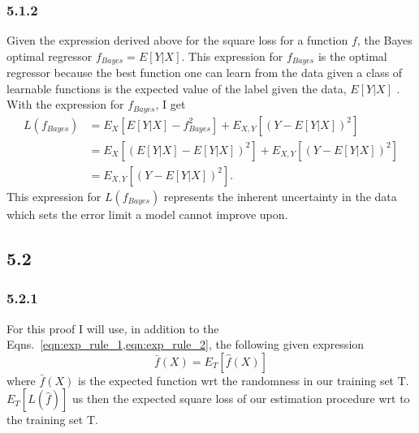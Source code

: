 \documentclass[12pt]{amsart}
\begin{document}
\subsubsection*{5.1.2}
Given the expression derived above for the square loss for a function $f$, the Bayes optimal regressor $f_{Bayes} = E[Y|X]$.  This expression for $f_{Bayes}$ is the optimal regressor because the best function one can learn from the data given a class of learnable functions is the expected value of the label given the data, $E[Y|X]$ .  With the expression for $f_{Bayes}$, I get 
\begin{equation}
\begin{split}
L(f_{Bayes}) & = E_X[E[Y|X] - f_{Bayes}^2] + E_{X,Y}[(Y - E[Y|X])^2] \\
& = E_X[(E[Y|X] - E[Y|X])^2] + E_{X,Y}[(Y - E[Y|X])^2] \\
& = E_{X,Y}[(Y - E[Y|X])^2].
\end{split}
\end{equation}
This expression for $L(f_{Bayes})$ represents the inherent uncertainty in the data which sets the error limit a model cannot improve upon.

\subsection*{5.2}

\subsubsection*{5.2.1}

For this proof I will use, in addition to the Eqns.~\ref{eqn:exp_rule_1,eqn:exp_rule_2}, the following given expression
\begin{equation} \label{eqn:fhat_fbar}
\bar{f}(X) = E_T[\hat{f}(X)]
\end{equation}
where $\bar{f}(X)$ is the expected function wrt the randomness in our training set T.  $E_T[L(\hat{f})]$ us then the expected square loss of our estimation procedure wrt to the training set T.
\end{document}

